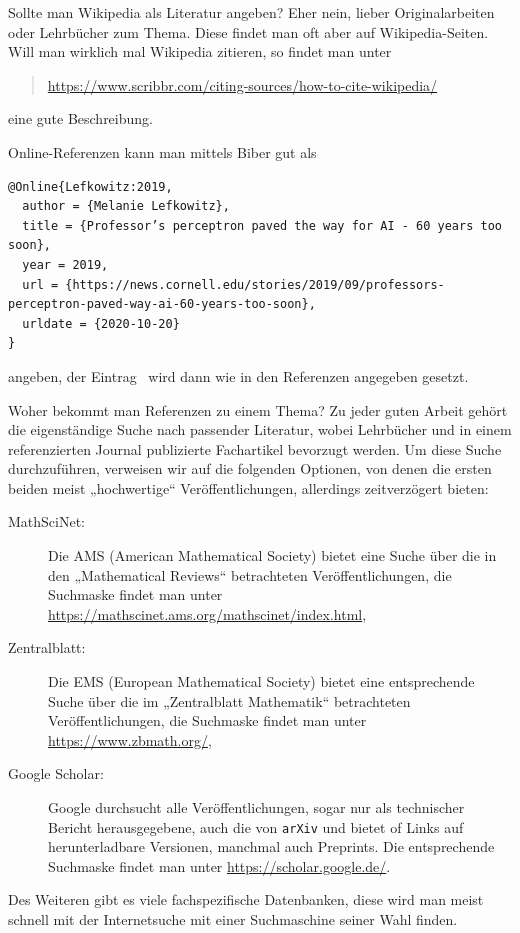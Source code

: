 \documentclass[12pt]{article}
\theoremstyle{definition}
\numberwithin{equation}{section}
\begin{document}
Sollte man Wikipedia als Literatur angeben? Eher nein, lieber
Originalarbeiten oder Lehrbücher zum Thema. Diese findet man oft aber
auf Wikipedia-Seiten. Will man wirklich mal Wikipedia zitieren, so
findet man unter
\begin{quote}
  \url{https://www.scribbr.com/citing-sources/how-to-cite-wikipedia/}
\end{quote}
eine gute Beschreibung.

Online-Referenzen kann man mittels Biber gut als
\begin{verbatim}
@Online{Lefkowitz:2019,
  author = {Melanie Lefkowitz},
  title = {Professor’s perceptron paved the way for AI - 60 years too soon},
  year = 2019,
  url = {https://news.cornell.edu/stories/2019/09/professors-perceptron-paved-way-ai-60-years-too-soon},
  urldate = {2020-10-20}
}
\end{verbatim}
angeben, der Eintrag~\cite{Lefkowitz:2019} wird dann wie in den
Referenzen angegeben gesetzt.

Woher bekommt man Referenzen zu einem Thema? Zu jeder guten Arbeit
gehört die eigenständige Suche nach passender Literatur, wobei
Lehrbücher und in einem referenzierten Journal publizierte Fachartikel
bevorzugt werden. Um diese Suche durchzuführen, verweisen wir auf die
folgenden Optionen, von denen die ersten beiden meist „hochwertige“
Veröffentlichungen, allerdings zeitverzögert bieten:
\begin{description}
\item[MathSciNet:] Die AMS (American Mathematical Society) bietet eine
  Suche über die in den „Mathematical Reviews“ betrachteten
  Veröffentlichungen, die Suchmaske findet man unter
  \url{https://mathscinet.ams.org/mathscinet/index.html},
\item[Zentralblatt:] Die EMS (European Mathematical Society) bietet
  eine entsprechende Suche über die im „Zentralblatt Mathematik“
  betrachteten Veröffentlichungen, die Suchmaske findet man unter
  \url{https://www.zbmath.org/},
\item[Google Scholar:] Google durchsucht alle Veröffentlichungen,
  sogar nur als technischer Bericht herausgegebene, auch die von
  \texttt{arXiv} und bietet of Links auf herunterladbare Versionen,
  manchmal auch Preprints. Die entsprechende Suchmaske findet man
  unter \url{https://scholar.google.de/}.
\end{description}
Des Weiteren gibt es viele fachspezifische Datenbanken, diese wird man
meist schnell mit der Internetsuche mit einer Suchmaschine seiner Wahl
finden.
\end{document}
